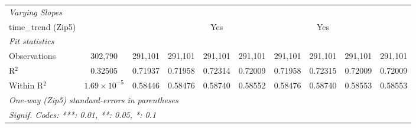 \begin{table}[H]
{\begin{tabular}{lccccccccc}
 \midrule \emph{Varying Slopes}&   &   &   &   &   &   &   &   &  \\ 

 time\_trend (Zip5) &  &  &  & Yes &  &  & Yes &  & \\ 

 \midrule \emph{Fit statistics}&  & & & & & & & & \\ 

 Observations & 302,790&291,101&291,101&291,101&291,101&291,101&291,101&291,101&291,101\\ 

 R$^2$ & 0.32505&0.71937&0.71958&0.72314&0.72009&0.71958&0.72315&0.72009&0.72009\\ 

 Within R$^2$ & $1.69\times 10^{-5}$&0.58446&0.58476&0.58740&0.58552&0.58476&0.58740&0.58553&0.58553\\ 

 \midrule\midrule\multicolumn{10}{l}{\emph{One-way (Zip5) standard-errors in parentheses}}\\ 

 \multicolumn{10}{l}{\emph{Signif. Codes: ***: 0.01, **: 0.05, *: 0.1}}\\ 

 \end{tabular}} 

 \end{table} 

  

